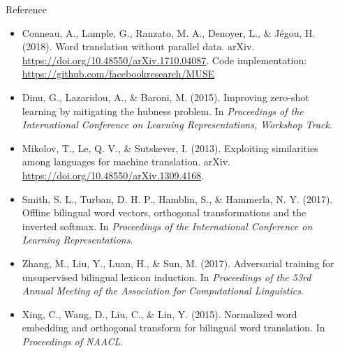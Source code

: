 \documentclass[final]{beamer}
\newlength{\sepwid}
\newlength{\onecolwid}
\begin{document}
\begin{frame}[t]
\begin{columns}[t]
\begin{column}{\onecolwid}
\begin{block}{Reference}
\vspace{-0.78cm}
\begin{itemize}
\scriptsize
\setlength{\itemsep}{-2mm} 
\item Conneau, A., Lample, G., Ranzato, M. A., Denoyer, L., \& Jégou, H. (2018). Word translation without parallel data. arXiv. \url{https://doi.org/10.48550/arXiv.1710.04087}. Code implementation: \url{https://github.com/facebookresearch/MUSE}
\item Dinu, G., Lazaridou, A., \& Baroni, M. (2015). Improving zero-shot learning by mitigating the hubness problem. In \textit{Proceedings of the International Conference on Learning Representations, Workshop Track}.
\item Mikolov, T., Le, Q. V., \& Sutskever, I. (2013). Exploiting similarities among languages for machine translation. arXiv. \url{https://doi.org/10.48550/arXiv.1309.4168}.
\item Smith, S. L., Turban, D. H. P., Hamblin, S., \& Hammerla, N. Y. (2017). Offline bilingual word vectors, orthogonal transformations and the inverted softmax. In \textit{Proceedings of the International Conference on Learning Representations}.
\item Zhang, M., Liu, Y., Luan, H., \& Sun, M. (2017). Adversarial training for unsupervised bilingual lexicon induction. In \textit{Proceedings of the 53rd Annual Meeting of the Association for Computational Linguistics}.
\item Xing, C., Wang, D., Liu, C., \& Lin, Y. (2015). Normalized word embedding and orthogonal transform for bilingual word translation. In \textit{Proceedings of NAACL}.
\end{itemize}
\end{block}






\end{column}

\begin{column}{\sepwid}\end{column}

\end{columns}
\end{frame}
\end{document}

